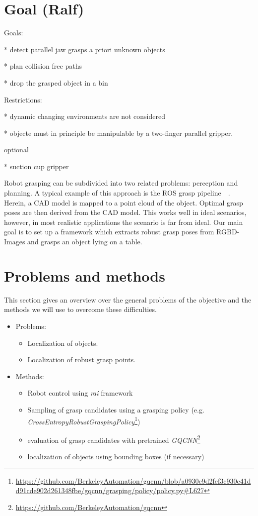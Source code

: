 \documentclass[a4paper]{article}
\begin{document}
\section{Goal (Ralf)} 
\label{2sec_goal}

Goals:

* detect parallel jaw grasps a priori unknown objects

* plan collision free paths 

* drop the grasped object in a bin


Restrictions:

* dynamic changing environments are not considered

* objecte must in principle be manipulable by a two-finger parallel gripper.


optional

* suction cup gripper


Robot grasping can be subdivided into two related problems: perception and planning.
A typical example of this approach is the ROS grasp pipeline~~\cite{chitta_perception_2012}.
Herein, a CAD model is mapped to a point cloud of the object.
Optimal grasp poses are then derived from the CAD model. 
This works well in ideal scenarios, however, in most realistic applications the scenario is far from ideal.
Our main goal is to set up a framework which extracts robust grasp poses from RGBD-Images and grasps an object lying on a table.

\section{Problems and methods}
\label{3sec_prob_n_meth}
This section gives an overview over the general problems of the objective and the methods we will use to overcome these difficulties.


\begin{itemize}
    \item Problems:\\
    \begin{itemize}
        \item Localization of objects.
        \item Localization of robust grasp points.
    \end{itemize}
    \item Methods:\\
    \begin{itemize}
        \item Robot control using \textit{rai} framework
        \item Sampling of grasp candidates using a grasping policy (e.g. \textit{CrossEntropyRobustGraspingPolicy}\footnote{\url{https://github.com/BerkeleyAutomation/gqcnn/blob/a0930e9d2fef3c930c41dd91cde902d261348fbe/gqcnn/grasping/policy/policy.py#L627}}) 
        \item evaluation of grasp candidates with pretrained \textit{GQCNN}\footnote{\url{https://github.com/BerkeleyAutomation/gqcnn}}
        \item localization of objects using bounding boxes (if necessary)
    \end{itemize}
\end{itemize}
\end{document}
